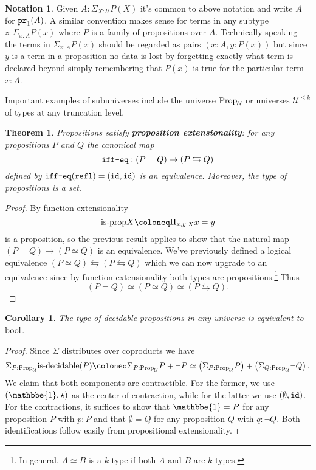 \documentclass{amsart}
\theoremstyle{theorem}
\newtheorem*{thm}{Theorem}
\newtheorem*{cor}{Corollary}
\theoremstyle{definition}
\newtheorem*{ntn}{Notation}
\theoremstyle{remark}
\newcommand{\0}{\mathbbe{0}}
\newcommand{\1}{\mathbbe{1}}
\newcommand{\2}{\mathbbe{2}}
\newcommand{\3}{\mathbbe{3}}
\newcommand{\4}{\mathbbe{4}}
\newcommand{\term}[1]{{\textup{\texttt{#1}}}}
\newcommand{\type}[1]{{\textup{#1}}}
\newcommand{\id}{\term{id}}
\newcommand{\pr}{\term{pr}}
\newcommand{\refl}{\term{refl}}
\newcommand{\UU}{{\mathcal{U}}}
\newcommand{\bool}{\type{bool}}
\newcommand{\is}[1]{\type{is-{#1}}}
\newcommand{\isprop}{\type{is-prop}}
\newcommand{\Prop}{\type{Prop}_{\UU}}
\begin{document}
\begin{ntn} Given $A : \Sigma_{X:\UU} P(X)$ it's common to above notation and write $A$ for $\pr_1(A)$. A similar convention makes sense for terms in any subtype $z : \Sigma_{x:A} P(x)$ where $P$ is a family of propositions over $A$. Technically speaking the terms in $\Sigma_{x:A} P(x)$ should be regarded as pairs $(x :A, y : P(x))$ but since $y$ is a term in a proposition no data is lost by forgetting exactly what term is declared beyond simply remembering that $P(x)$ is true for the particular term $x:A$.
\end{ntn}

Important examples of subuniverses include the universe $\type{Prop}_\UU$ or universes $\UU^{\leq k}$ of types at any truncation level.

\begin{thm} Propositions satisfy \textbf{proposition extensionality}: for any propositions $P$ and $Q$ the canonical map
\[ \term{iff-eq} :(P=Q) \to (P \leftrightarrows Q)\]
defined by $\term{iff-eq}(\refl)=(\id,\id)$ is an equivalence. Moreover, the type of propositions is a set.
\end{thm}
\begin{proof}
By function extensionality
\[ \isprop{X} \coloneq \Pi_{x,y : X} x=y\]
is a proposition, so the previous result applies to show that the natural map $(P =Q) \to (P \simeq Q)$ is an equivalence. We've previously defined a logical equivalence $(P \simeq Q) \leftrightarrows (P \leftrightarrows Q)$ which we can now upgrade to an equivalence since by function extensionality both types are propositions.\footnote{In general, $A \simeq B$ is a $k$-type if both $A$ and $B$ are $k$-types.} Thus 
\[ (P=Q) \simeq (P \simeq Q) \simeq (P \leftrightarrows Q).\]
\end{proof}

\begin{cor} The type of decidable propositions in any universe is equivalent to $\bool$.
\end{cor}
\begin{proof}
Since $\Sigma$ distributes over coproducts we have
\[ \Sigma_{P : \Prop} \is{decidable}(P) \coloneq \Sigma_{P: \Prop} P +\neg P \simeq \left( \Sigma_{P: \Prop} P \right) + \left( \Sigma_{Q : \Prop} \neg Q\right).\] We claim that both components are contractible. For the former, we use $(\1,\star)$ as the center of contraction, while for the latter we use $(\emptyset, \id)$. For the contractions, it suffices to show that $\1=P$ for any proposition $P$ with $p : P$ and that $\emptyset = Q$ for any proposition $Q$ with $q: \neg Q$. Both identifications follow easily from propositional extensionality.
\end{proof}
\end{document}
